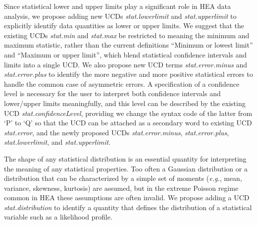 \documentclass[11pt,a4paper]{ivoa}
\begin{document}
Since statistical lower and upper limits play a significant role in \gls{HEA} data analysis, we propose adding new UCDs {\em stat.lowerlimit\/} and {\em stat.upperlimit\/} to explicitly identify data quantities as lower or upper limits.  We suggest that the existing UCDs {\em stat.min\/} and {\em stat.max\/} be restricted to meaning the minimum and maximum statistic, rather than the current definitions ``Minimum or lowest limit'' and ``Maximum or upper limit'', which blend statistical confidence intervals and limits into a  single UCD\null. 
We also propose new UCD terms {\em stat.error.minus\/} and {\em stat.error.plus\/} to identify the more negative and more positive statistical errors to handle the common case of asymmetric errors.
 A specification of a confidence level is necessary for the user to interpret both confidence intervals and lower/upper limits meaningfully, and this level can be described by the existing UCD {\em stat.confidenceLevel\/}, providing we change the syntax code of the latter from `P' to `Q' so that the UCD can be attached as a secondary word to existing UCD {\em stat.error\/}, and the newly proposed UCDs {\em stat.error.minus\/}, {\em stat.error.plus\/}, {\em stat.lowerlimit\/}, and {\em stat.upperlimit\/}.
 


The shape of any statistical distribution is an essential quantity for interpreting the meaning of any statistical properties.  Too often a Gaussian distribution or a distribution that can be characterized by a simple set of moments ({\em e.g.\/}, mean, variance, skewness, kurtosis) are assumed, but in the extreme Poisson regime common in \gls{HEA} these assumptions are often invalid.  We propose adding a UCD {\em stat.distribution \/} to identify a quantity that defines the distribution of a statistical variable such as  a likelihood profile.
\end{document}
